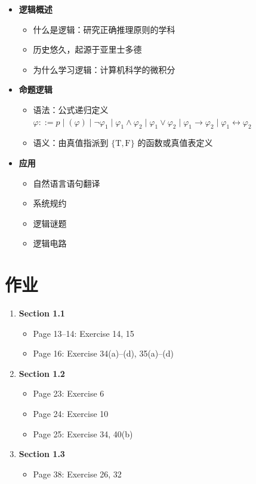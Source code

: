 \documentclass[UTF8,11pt,a4paper]{ctexbook}   %
\theoremstyle{definition}
\begin{document}
\begin{itemize}
    \item \textbf{逻辑概述}
    \begin{itemize}
        \item 什么是逻辑：研究正确推理原则的学科
        \item 历史悠久，起源于亚里士多德
        \item 为什么学习逻辑：计算机科学的微积分
    \end{itemize}
    \item \textbf{命题逻辑}
    \begin{itemize}
        \item 语法：公式递归定义 $\varphi ::= p \mid (\varphi) \mid \neg \varphi_1 \mid \varphi_1 \land \varphi_2 \mid \varphi_1 \lor \varphi_2 \mid \varphi_1 \rightarrow \varphi_2 \mid \varphi_1 \leftrightarrow \varphi_2$
        \item 语义：由真值指派到 $\{\text{T}, \text{F}\}$ 的函数或真值表定义
    \end{itemize}
    \item \textbf{应用}
    \begin{itemize}
        \item 自然语言语句翻译
        \item 系统规约
        \item 逻辑谜题
        \item 逻辑电路
    \end{itemize}
\end{itemize}

\section{作业}

\begin{enumerate}
    \item \textbf{Section 1.1}
    \begin{itemize}
        \item Page 13--14: Exercise 14, 15
        \item Page 16: Exercise 34(a)--(d), 35(a)--(d)
    \end{itemize}
    \item \textbf{Section 1.2}
    \begin{itemize}
        \item Page 23: Exercise 6
        \item Page 24: Exercise 10
        \item Page 25: Exercise 34, 40(b)
    \end{itemize}
    \item \textbf{Section 1.3}
    \begin{itemize}
        \item Page 38: Exercise 26, 32
    \end{itemize}
\end{enumerate}
\end{document}
